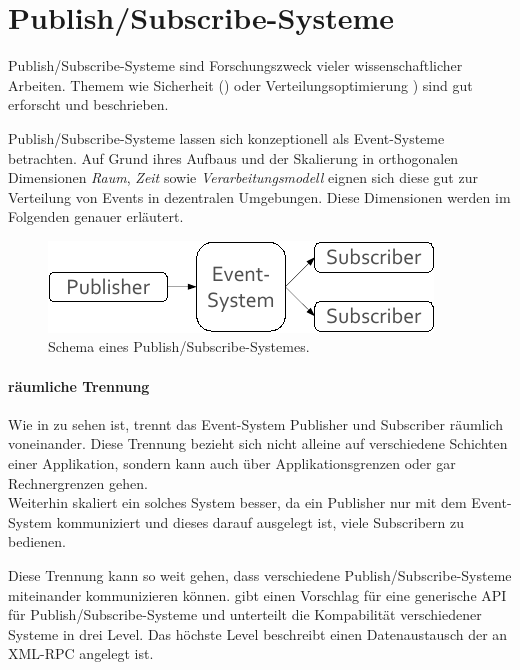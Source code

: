 \section{Publish/Subscribe-Systeme}
\label{chap:grundlagen:pubsub}
Publish/Subscribe-Systeme sind Forschungszweck vieler wissenschaftlicher Arbeiten\cite{Liu2003Survey, Banerjee2001Comparative}. Themem wie Sicherheit (\cite{FiegeSecurity}) oder Verteilungsoptimierung \cite{Muhl2002LargeScale, Castro2002Scribe}) sind gut erforscht und beschrieben.

Publish/Subscribe-Systeme lassen sich konzeptionell als Event-Systeme betrachten. Auf Grund ihres Aufbaus und der Skalierung  in orthogonalen Dimensionen \emph{Raum}, \emph{Zeit} sowie \emph{Verarbeitungsmodell} eignen sich diese gut zur Verteilung von Events in dezentralen Umgebungen\cite{PatrickTh2003Many}. Diese Dimensionen werden im Folgenden genauer erläutert.

\begin{figure}[htbp]
\centering
\includegraphics{grafics/pubsub_black_box.pdf}
\caption{Schema eines Publish/Subscribe-Systemes.}
\label{fig:pubsub_black_box}
\end{figure}

\paragraph{räumliche Trennung}
Wie in  zu sehen ist, trennt das Event-System Publisher und Subscriber räumlich voneinander. Diese Trennung bezieht sich nicht alleine auf verschiedene Schichten einer Applikation, sondern kann auch über Applikationsgrenzen oder gar Rechnergrenzen gehen. \\
Weiterhin skaliert ein solches System besser, da ein Publisher nur mit dem Event-System kommuniziert und dieses darauf ausgelegt ist, viele Subscribern zu bedienen.

Diese Trennung kann so weit gehen, dass verschiedene Publish/Subscribe-Systeme miteinander kommunizieren können. \cite{PiEyKoSh2007-PubSubAPI} gibt einen Vorschlag für eine generische API für Publish/Subscribe-Systeme und unterteilt die Kompabilität verschiedener Systeme in drei Level. Das höchste Level beschreibt einen Datenaustausch der an XML-RPC angelegt ist.

